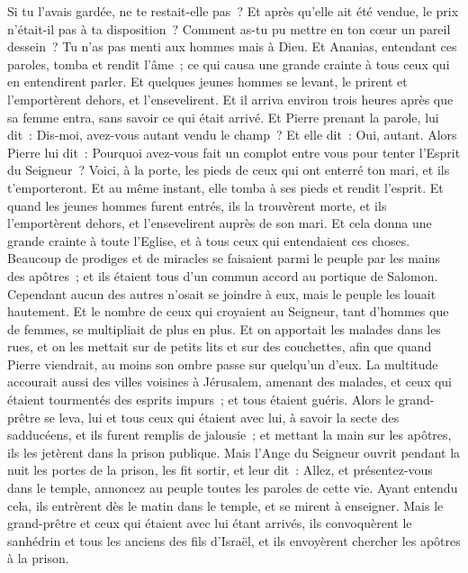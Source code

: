 \begin{multicols}{2}
Si tu l'avais gardée, ne te restait-elle pas~? Et après qu'elle ait été vendue, le prix n'était-il pas à ta disposition~? Comment as-tu pu mettre en ton cœur un pareil dessein~? Tu n'as pas menti aux hommes mais à Dieu.
Et Ananias, entendant ces paroles, tomba et rendit l'âme~; ce qui causa une grande crainte à tous ceux qui en entendirent parler.
Et quelques jeunes hommes se levant, le prirent et l'emportèrent dehors, et l'ensevelirent.
Et il arriva environ trois heures après que sa femme entra, sans savoir ce qui était arrivé.
Et Pierre prenant la parole, lui dit~: Dis-moi, avez-vous autant vendu le champ~? Et elle dit~: Oui, autant.
Alors Pierre lui dit~: Pourquoi avez-vous fait un complot entre vous pour tenter l'Esprit du Seigneur~? Voici, à la porte, les pieds de ceux qui ont enterré ton mari, et ils t'emporteront.
Et au même instant, elle tomba à ses pieds et rendit l'esprit. Et quand les jeunes hommes furent entrés, ils la trouvèrent morte, et ils l'emportèrent dehors, et l'ensevelirent auprès de son mari.
Et cela donna une grande crainte à toute l'Eglise, et à tous ceux qui entendaient ces choses.
Beaucoup de prodiges et de miracles se faisaient parmi le peuple par les mains des apôtres~; et ils étaient tous d'un commun accord au portique de Salomon.
Cependant aucun des autres n'osait se joindre à eux, mais le peuple les louait hautement.
Et le nombre de ceux qui croyaient au Seigneur, tant d'hommes que de femmes, se multipliait de plus en plus.
Et on apportait les malades dans les rues, et on les mettait sur de petits lits et sur des couchettes, afin que quand Pierre viendrait, au moins son ombre passe sur quelqu'un d'eux.
La multitude accourait aussi des villes voisines à Jérusalem, amenant des malades, et ceux qui étaient tourmentés des esprits impurs~; et tous étaient guéris.
Alors le grand-prêtre se leva, lui et tous ceux qui étaient avec lui, à savoir la secte des sadducéens, et ils furent remplis de jalousie~;
et mettant la main sur les apôtres, ils les jetèrent dans la prison publique.
Mais l'Ange du Seigneur ouvrit pendant la nuit les portes de la prison, les fit sortir, et leur dit~:
Allez, et présentez-vous dans le temple, annoncez au peuple toutes les paroles de cette vie.
Ayant entendu cela, ils entrèrent dès le matin dans le temple, et se mirent à enseigner. Mais le grand-prêtre et ceux qui étaient avec lui étant arrivés, ils convoquèrent le sanhédrin et tous les anciens des fils d'Israël, et ils envoyèrent chercher les apôtres à la prison.

\end{multicols}
